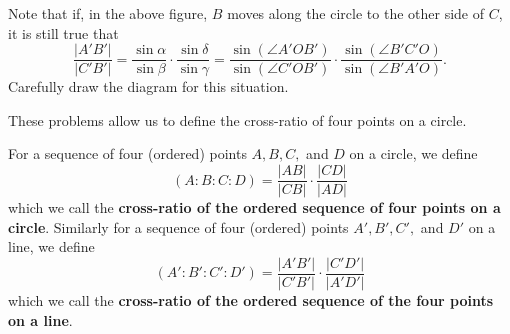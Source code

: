 \documentclass{ximera}
\begin{document}



\begin{problem}
Note that if, in the above figure, $B$ moves along the
circle to the other side of $C$, it is still true that%
\[
\frac{\left|A'B'\right|}{\left|C'B'\right|}=
\frac{\sin\alpha}{\sin\beta}\cdot\frac{\sin\delta}{\sin\gamma}=
\frac{\sin\left(\angle A'OB'\right)}{\sin\left(\angle C'OB'\right)}\cdot\frac{
\sin\left( \angle B'C'O\right)}{\sin\left(\angle B'A'O\right)}.
\]
Carefully draw the diagram for this situation.
\end{problem}

These problems allow us to define the cross-ratio of four points on a
circle.

\begin{definition}
For a sequence of four (ordered) points $A,B,C,$ and $D$ on a circle,
we define%
\[
\left(A:B:C:D\right)=
\frac{\left| AB\right|}{\left|CB\right|}\cdot
\frac{
\left|CD\right|
}{
\left|AD\right|
}%
\]
which we call the \textbf{cross-ratio of the ordered sequence of four
  points on a circle}.  Similarly for a sequence of four (ordered) points
$A',B',C',$ and $D'$ on a line, we define%
\[
\left(  A':B':C':D'\right)  =
\frac{\left| A'B'\right| }{\left| C'B'\right|
}\cdot
\frac{
\left|C'D'\right|
}{
\left|A'D'\right|
}
\]
which we call the \textbf{cross-ratio of the ordered sequence of the
  four points on a line}.
\end{definition}
\end{document}
